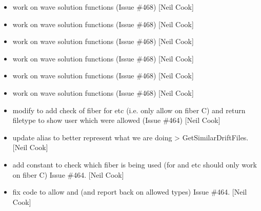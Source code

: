 \documentclass[a4paper,10pt,english]{report}
\begin{document}
\begin{itemize}
\item {} 
 \sphinxhyphen{} work on wave solution functions (Issue \#468)
{[}Neil Cook{]}

\item {} 
 \sphinxhyphen{} work on wave solution functions (Issue
\#468) {[}Neil Cook{]}

\item {} 
 \sphinxhyphen{} work on wave solution functions (Issue \#468) {[}Neil
Cook{]}

\item {} 
 \sphinxhyphen{} work on wave solution functions (Issue \#468)
{[}Neil Cook{]}

\item {} 
 \sphinxhyphen{} work on wave solution functions (Issue
\#468) {[}Neil Cook{]}

\item {} 
 \sphinxhyphen{} work on wave solution functions (Issue
\#468) {[}Neil Cook{]}

\item {} 
 \sphinxhyphen{} modify  to add check of fiber
for   etc (i.e. only allow on fiber C) and return
filetype to show user which  were allowed (Issue \#464) {[}Neil
Cook{]}

\item {} 
 \sphinxhyphen{} update alias to better represent what we are
doing  \textendash{}\textgreater{} GetSimilarDriftFiles. {[}Neil Cook{]}

\item {} 
 \sphinxhyphen{} add constant to check which fiber is being
used (for  and  etc should only work on fiber C)  \sphinxhyphen{}
Issue \#464. {[}Neil Cook{]}

\item {} 
 \sphinxhyphen{} fix code to allow  and  (and
report back on allowed types) \sphinxhyphen{} Issue \#464. {[}Neil Cook{]}


\end{itemize}
\end{document}
